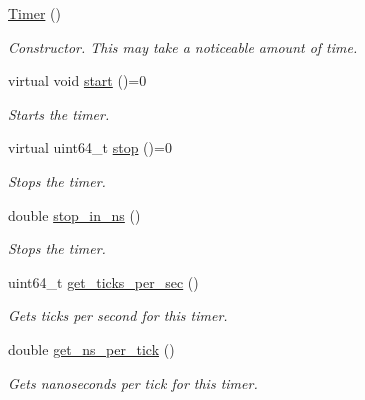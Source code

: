 \begin{DoxyCompactItemize}
\item 
\hypertarget{classxmem_1_1timers_1_1_timer_a5f16e8da27d2a5a5242dead46de05d97}{}\hyperlink{classxmem_1_1timers_1_1_timer_a5f16e8da27d2a5a5242dead46de05d97}{Timer} ()\label{classxmem_1_1timers_1_1_timer_a5f16e8da27d2a5a5242dead46de05d97}

\begin{DoxyCompactList}\small\item\em Constructor. This may take a noticeable amount of time. \end{DoxyCompactList}\item 
\hypertarget{classxmem_1_1timers_1_1_timer_af94a88fb78dd9edf299d4421e17f5fb3}{}virtual void \hyperlink{classxmem_1_1timers_1_1_timer_af94a88fb78dd9edf299d4421e17f5fb3}{start} ()=0\label{classxmem_1_1timers_1_1_timer_af94a88fb78dd9edf299d4421e17f5fb3}

\begin{DoxyCompactList}\small\item\em Starts the timer. \end{DoxyCompactList}\item 
virtual uint64\+\_\+t \hyperlink{classxmem_1_1timers_1_1_timer_a3be174c5eb733a2974ce76c146874e1f}{stop} ()=0
\begin{DoxyCompactList}\small\item\em Stops the timer. \end{DoxyCompactList}\item 
double \hyperlink{classxmem_1_1timers_1_1_timer_ae215ce438bb77e6c66aba6620f1e475a}{stop\+\_\+in\+\_\+ns} ()
\begin{DoxyCompactList}\small\item\em Stops the timer. \end{DoxyCompactList}\item 
uint64\+\_\+t \hyperlink{classxmem_1_1timers_1_1_timer_a86ec138f64ed24929ea12b08455fd0c0}{get\+\_\+ticks\+\_\+per\+\_\+sec} ()
\begin{DoxyCompactList}\small\item\em Gets ticks per second for this timer. \end{DoxyCompactList}\item 
double \hyperlink{classxmem_1_1timers_1_1_timer_a220f44f7372cc596141a4ddbd28fdf81}{get\+\_\+ns\+\_\+per\+\_\+tick} ()
\begin{DoxyCompactList}\small\item\em Gets nanoseconds per tick for this timer. \end{DoxyCompactList}\end{DoxyCompactItemize}
